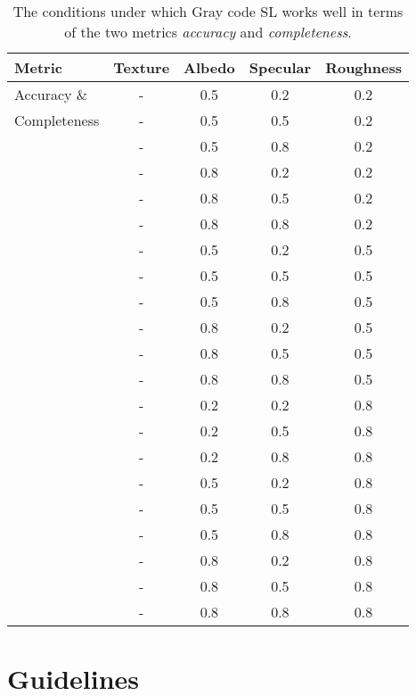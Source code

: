 \begin{table}[!htbp]
  \centering
  \begin{tabular}{l*{4}{c}}
  \hline
  \textbf{Metric} & Texture & Albedo & Specular & Roughness\\
  \hline
  Accuracy \&  & - & 0.5 & 0.2 & 0.2\\
  Completeness & - & 0.5 & 0.5 & 0.2\\
               & - & 0.5 & 0.8 & 0.2\\
               & - & 0.8 & 0.2 & 0.2\\
               & - & 0.8 & 0.5 & 0.2\\
               & - & 0.8 & 0.8 & 0.2\\
               & - & 0.5 & 0.2 & 0.5\\
               & - & 0.5 & 0.5 & 0.5\\
               & - & 0.5 & 0.8 & 0.5\\
               & - & 0.8 & 0.2 & 0.5\\
               & - & 0.8 & 0.5 & 0.5\\
               & - & 0.8 & 0.8 & 0.5\\
               & - & 0.2 & 0.2 & 0.8\\
               & - & 0.2 & 0.5 & 0.8\\
               & - & 0.2 & 0.8 & 0.8\\
               & - & 0.5 & 0.2 & 0.8\\
               & - & 0.5 & 0.5 & 0.8\\
               & - & 0.5 & 0.8 & 0.8\\
               & - & 0.8 & 0.2 & 0.8\\
               & - & 0.8 & 0.5 & 0.8\\
               & - & 0.8 & 0.8 & 0.8\\
  \hline
  \end{tabular}
  \caption{The conditions under which Gray code SL works well in terms of the two metrics \textit{accuracy} and \textit{completeness}.}
  \label{tab:sl_traing_result}
\end{table}

\section{Guidelines}


